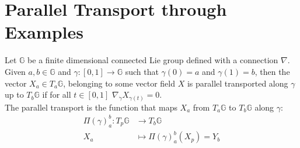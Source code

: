 \section{Parallel Transport through Examples}
\begin{definition}
	Let $\mathbb{G}$ be a finite dimensional connected Lie group defined with a connection $\nabla$. Given $a,b \in \mathbb{G}$ and $\gamma : [0,1] \rightarrow \mathbb{G}$ such that $\gamma(0) = a$ and $\gamma(1) = b$, then the vector $X_{a} \in T_{a}\mathbb{G}$, belonging to some vector field $X$ is parallel transported along $\gamma$ up to $T_{b}\mathbb{G}$ if for all $t \in  [0,1]$ $\nabla_{\dot{\gamma}}X_{\gamma(t)} = 0$.\\
	The parallel transport is the function that maps $X_{a}$ from $T_{a}\mathbb{G}$ to $T_{b}\mathbb{G}$ along $\gamma$:
	\begin{align*}
		\Pi(\gamma)_{a}^{b} :  T_{p}\mathbb{G} & \longrightarrow T_{b}\mathbb{G}  \\
		X_{a}&\longmapsto \Pi(\gamma)_{a}^{b}(X_{p}) = Y_{b}
	\end{align*}
\end{definition}


